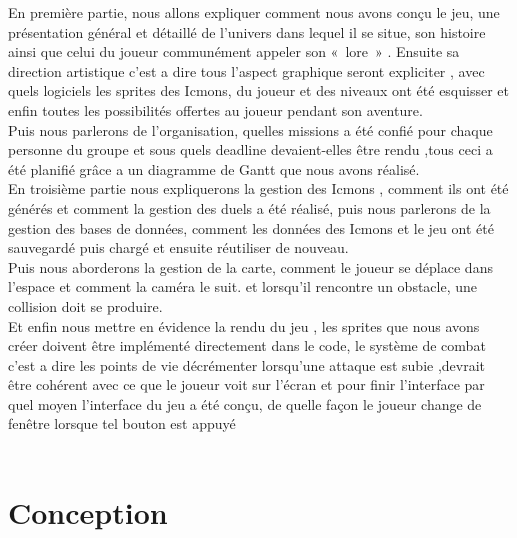 \documentclass[12pt,a4paper, twoside]{article}
\begin{document}
En première partie, nous allons expliquer comment nous avons conçu le jeu, une présentation général et détaillé de l’univers dans lequel il se situe, son histoire ainsi que celui du joueur communément appeler son « lore » .
Ensuite sa direction artistique c’est a dire tous l’aspect graphique seront expliciter , avec quels logiciels les sprites des Icmons, du joueur et des niveaux ont été esquisser et enfin toutes les possibilités offertes au joueur pendant son aventure.\\

Puis nous parlerons de l’organisation, quelles missions a été confié pour chaque personne du groupe et sous quels deadline devaient-elles être rendu ,tous ceci a été planifié grâce a un diagramme de Gantt que nous avons réalisé.\\

En troisième partie nous expliquerons la gestion des Icmons , comment ils ont été générés et comment la gestion des duels a été réalisé, puis nous parlerons de la gestion des bases de données, comment les données des Icmons et le jeu ont été sauvegardé puis chargé et ensuite réutiliser de nouveau.\\

Puis nous aborderons la gestion de la carte, comment le joueur se déplace dans l'espace et comment la caméra le suit. et lorsqu'il rencontre un obstacle, une collision doit se produire.\\

Et enfin nous mettre en évidence la rendu du jeu , les sprites que nous avons créer doivent être implémenté directement dans le code, le système de combat c’est a dire les points de vie décrémenter lorsqu’une attaque est subie ,devrait être cohérent avec ce que le joueur voit sur l’écran et pour finir l’interface par quel moyen l’interface du jeu a été conçu, de quelle façon le joueur change de fenêtre lorsque tel bouton est appuyé\\\\
\lfoot{}
\newpage
\section{Conception}
\end{document}
